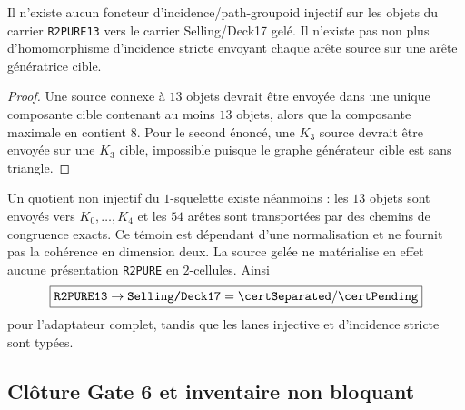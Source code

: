 \begin{proposition}\label{prop:v54-r2-no-go}
Il n'existe aucun foncteur d'incidence/path-groupoid injectif sur les objets du carrier
\texttt{R2PURE13} vers le carrier Selling/Deck17 gelé. Il n'existe pas non plus d'homomorphisme
d'incidence stricte envoyant chaque arête source sur une arête génératrice cible.
\end{proposition}

\begin{proof}
Une source connexe à $13$ objets devrait être envoyée dans une unique composante cible contenant au
moins $13$ objets, alors que la composante maximale en contient $8$. Pour le second énoncé, une
$K_3$ source devrait être envoyée sur une $K_3$ cible, impossible puisque le graphe générateur cible
est sans triangle.
\end{proof}

Un quotient non injectif du $1$-squelette existe néanmoins : les $13$ objets sont envoyés vers
$K_0,\ldots,K_4$ et les $54$ arêtes sont transportées par des chemins de congruence exacts. Ce témoin
est dépendant d'une normalisation et ne fournit pas la cohérence en dimension deux. La source gelée
ne matérialise en effet aucune présentation \texttt{R2PURE} en $2$-cellules. Ainsi
\[
 \boxed{\texttt{R2PURE13}\to\texttt{Selling/Deck17}
 =\certSeparated/\certPending}
\]
pour l'adaptateur complet, tandis que les lanes injective et d'incidence stricte sont
\certRefuted{} typées.

\subsection{Clôture Gate 6 et inventaire non bloquant}

